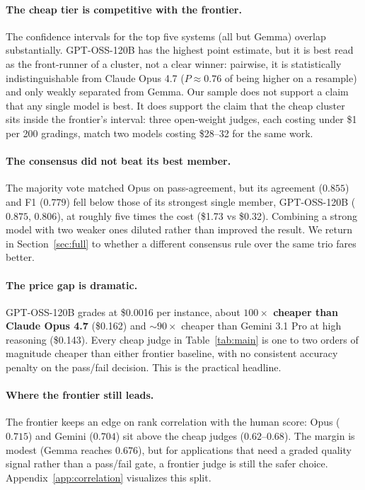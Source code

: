 \documentclass{article}
\begin{document}
\paragraph{The cheap tier is competitive with the frontier.}
The confidence intervals for the top five systems (all but Gemma) overlap
substantially. GPT-OSS-120B has the highest point estimate, but it is best read as
the front-runner of a cluster, not a clear winner: pairwise, it is statistically
indistinguishable from Claude Opus 4.7 ($P \approx 0.76$ of being higher on a
resample) and only weakly separated from Gemma. Our sample does not support a
claim that any single model is best. It does support the claim that the cheap
cluster sits inside the frontier's interval: three open-weight judges, each costing
under \$1 per 200 gradings, match two models costing \$28--32 for the same work.

\paragraph{The consensus did not beat its best member.}
The majority vote matched Opus on pass-agreement, but its agreement ($0.855$) and
F1 ($0.779$) fell below those of its strongest single member, GPT-OSS-120B
($0.875$, $0.806$), at roughly five times the cost (\$1.73 vs \$0.32). Combining a
strong model with two weaker ones diluted rather than improved the result. We
return in Section~\ref{sec:full} to whether a different consensus rule over the
same trio fares better.

\paragraph{The price gap is dramatic.}
GPT-OSS-120B grades at \$0.0016 per instance, about \textbf{$100\times$ cheaper
than Claude Opus 4.7} (\$0.162) and ${\sim}90\times$ cheaper than Gemini 3.1 Pro at
high reasoning (\$0.143). Every cheap judge in Table~\ref{tab:main} is one to two
orders of magnitude cheaper than either frontier baseline, with no consistent
accuracy penalty on the pass/fail decision. This is the practical headline.

\paragraph{Where the frontier still leads.}
The frontier keeps an edge on rank correlation with the human score: Opus ($0.715$)
and Gemini ($0.704$) sit above the cheap judges ($0.62$--$0.68$). The margin is
modest (Gemma reaches $0.676$), but for applications that need a graded quality
signal rather than a pass/fail gate, a frontier judge is still the safer choice.
Appendix~\ref{app:correlation} visualizes this split.
\end{document}
